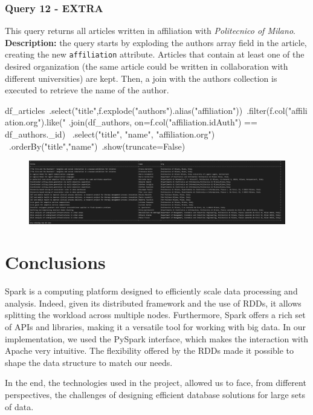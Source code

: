 \documentclass{Configuration_Files/PoliMi3i_thesis}
\begin{document}
\subsection{Query 12 - EXTRA}
This query returns all articles written in affiliation with \emph{Politecnico of Milano}.\newline
\textbf{Description:} the query starts by exploding the authors array field in the article, creating the new \verb|affiliation| attribute.
Articles that contain at least one of the desired organization (the same article could be written in collaboration with different
universities) are kept. Then, a join with the authors collection is executed to retrieve the name of the author.
\begin{python}
df_articles\
    .select("title",f.explode("authors").alias("affiliation"))\
    .filter(f.col("affiliation.org").like("%
    .join(df_authors, on=f.col("affiliation.idAuth") == df_authors._id) \
    .select("title", "name", "affiliation.org") \
    .orderBy("title","name")\
    .show(truncate=False)
\end{python}
\begin{figure}[H]
\centering
\includegraphics[width=1\textwidth]{query/spark_q12.PNG}
\label{fig:query12}
\end{figure}


\chapter{Conclusions}
\label{ch:conclusions}
Spark is a computing platform designed to efficiently scale data processing and analysis.
Indeed, given its distributed framework and the use of RDDs, it allows splitting the workload across multiple nodes.
Furthermore, Spark offers a rich set of APIs and libraries, making it a versatile tool for working with big data.
In our implementation, we used the PySpark interface, which makes the interaction with Apache very intuitive.
The flexibility offered by the RDDs made it possible to shape the data structure to match our needs.

In the end, the technologies used in the project, allowed us to face, from different perspectives, the challenges of
designing efficient database solutions for large sets of data.
\end{document}
